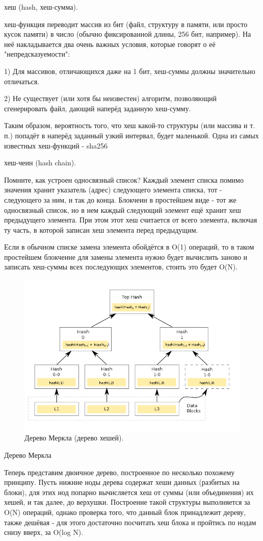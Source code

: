 \documentclass{book}
\begin{document}
хеш (hash, хеш-сумма).

хеш-функция переводит массив из бит (файл, структуру в памяти, или просто кусок памяти) в число
(обычно фиксированной длины, 256 бит, например). На неё накладывается два очень важных условия,
которые говорят о её "непредсказуемости":

1) Для массивов, отличающихся даже на 1 бит, хеш-суммы должны значительно отличаться.

2) Не существует (или хотя бы неизвестен) алгоритм, позволяющий сгенерировать файл, дающий наперёд
заданную хеш-сумму.

Таким образом, вероятность того, что хеш какой-то структуры (или массива и т. п.) попадёт в наперёд
заданный узкий интервал, будет маленькой. Одна из самых известных хеш-функций - sha256

хеш-чеин (hash chain).

Помните, как устроен односвязный список? Каждый элемент списка помимо значения хранит указатель
(адрес) следующего элемента списка, тот - следующего за ним, и так до конца. Блокчеин в простейшем
виде - тот же односвязный список, но в нем каждый следующий элемент ещё хранит хеш предыдущего
элемента. При этом этот хеш считается от всего элемента, включая ту часть, в которой записан хеш
элемента перед предыдущим.

Если в обычном списке замена элемента обойдётся в O(1) операций, то в таком простейшем блокчеине
для замены элемента нужно будет вычислить заново и записать хеш-суммы всех последующих элементов,
стоить это будет O(N).

\begin{figure}
	\includegraphics[width=0.6\linewidth]{hash-tree.png}
    \caption{\label{hash-tree}Дерево Меркла (дерево хешей).}
\end{figure}

Дерево Меркла

Теперь представим двоичное дерево, построенное по несколько похожему принципу. Пусть нижние ноды
дерева содержат хеши данных (разбитых на блоки), для этих нод попарно вычисляется хеш от суммы (или
объединения) их хешей, и так далее, до верхушки. Построение такой структуры выполняется за O(N)
операций, однако проверка того, что данный блок принадлежит дереву, также дешёвая - для этого
достаточно посчитать хеш блока и пройтись по нодам снизу вверх, за O(log N).
\end{document}
